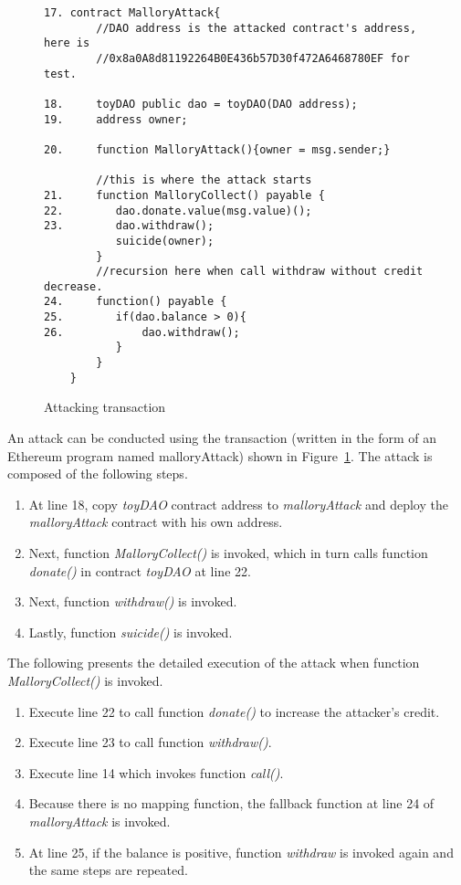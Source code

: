 \documentclass[sigconf,review,anonymous]{acmart}
\begin{document}
\begin{figure}	
	{\footnotesize
	\begin{verbatim}
17.	contract MalloryAttack{
	    //DAO address is the attacked contract's address, here is
	    //0x8a0A8d81192264B0E436b57D30f472A6468780EF for test.
	
18.	    toyDAO public dao = toyDAO(DAO address);
19.	    address owner;

20.	    function MalloryAttack(){owner = msg.sender;}

        //this is where the attack starts
21.	    function MalloryCollect() payable {
22.	       dao.donate.value(msg.value)();
23.	       dao.withdraw();
           suicide(owner);
        }
	    //recursion here when call withdraw without credit decrease.
24.	    function() payable {
25.	       if(dao.balance > 0){
26.	           dao.withdraw();
           }
        }
    }	
	\end{verbatim} }
\caption{Attacking transaction}
\label{transaction2}
\end{figure}

An attack can be conducted using the transaction (written in the form of an Ethereum program named malloryAttack) shown in Figure~\ref{transaction2}. The attack is composed of the following steps.
\begin{enumerate}
\item At line 18, copy \emph{toyDAO} contract address to \emph{malloryAttack} and deploy the \emph{malloryAttack} contract with his own address.
\item Next, function \emph{MalloryCollect()} is invoked, which in turn calls function \emph{donate()} in contract \emph{toyDAO} at line 22. 
\item Next, function \emph{withdraw()} is invoked. 
\item Lastly, function \emph{suicide()} is invoked.
\end{enumerate}

The following presents the detailed execution of the attack when function \emph{MalloryCollect()} is invoked.
\begin{enumerate}

    \item Execute line 22 to call function \emph{donate()} to increase the attacker's credit.

    \item Execute line 23 to call function \emph{withdraw()}.
    \item Execute line 14 which invokes function \emph{call()}.
    \item Because there is no mapping function, the fallback function at line 24 of \emph{malloryAttack} is invoked. 
    \item At line 25, if the balance is positive, function \emph{withdraw} is invoked again and the same steps are repeated. 
\end{enumerate}
\end{document}
